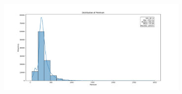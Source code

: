 \documentclass{article}
\begin{document}
\includegraphics[width=0.7\textwidth, keepaspectratio]{images/premium.png}


    
    
    
    
\end{document}
